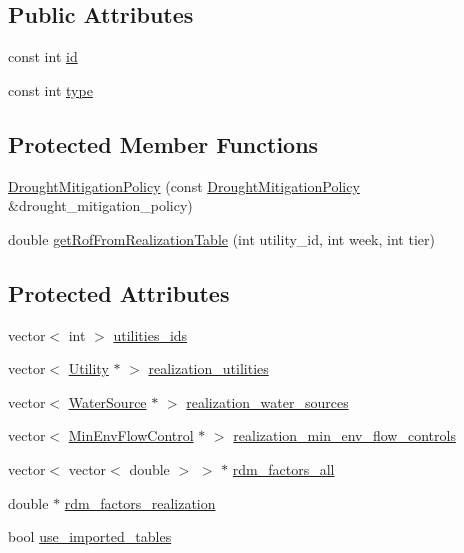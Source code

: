 \subsection*{Public Attributes}
\begin{DoxyCompactItemize}
\item 
const int \mbox{\hyperlink{classDroughtMitigationPolicy_abf3ed19ed98e0d74dc9ae24094be640b}{id}}
\item 
const int \mbox{\hyperlink{classDroughtMitigationPolicy_aaea5016d1462bec889cb8df85aececc6}{type}}
\end{DoxyCompactItemize}
\subsection*{Protected Member Functions}
\begin{DoxyCompactItemize}
\item 
\mbox{\hyperlink{classDroughtMitigationPolicy_aaf0715876ce33a75c7db92e50523ea0c}{Drought\+Mitigation\+Policy}} (const \mbox{\hyperlink{classDroughtMitigationPolicy}{Drought\+Mitigation\+Policy}} \&drought\+\_\+mitigation\+\_\+policy)
\item 
double \mbox{\hyperlink{classDroughtMitigationPolicy_a685ce7eacb01cb262d7e5245a736aa38}{get\+Rof\+From\+Realization\+Table}} (int utility\+\_\+id, int week, int tier)
\end{DoxyCompactItemize}
\subsection*{Protected Attributes}
\begin{DoxyCompactItemize}
\item 
vector$<$ int $>$ \mbox{\hyperlink{classDroughtMitigationPolicy_ad19fbc5a9fdf17ed50c0ba0b99d47eca}{utilities\+\_\+ids}}
\item 
vector$<$ \mbox{\hyperlink{classUtility}{Utility}} $\ast$ $>$ \mbox{\hyperlink{classDroughtMitigationPolicy_af6e5787a58017804d8598effbeeaba8e}{realization\+\_\+utilities}}
\item 
vector$<$ \mbox{\hyperlink{classWaterSource}{Water\+Source}} $\ast$ $>$ \mbox{\hyperlink{classDroughtMitigationPolicy_ae2104e99c421513902ba66d012484c0e}{realization\+\_\+water\+\_\+sources}}
\item 
vector$<$ \mbox{\hyperlink{classMinEnvFlowControl}{Min\+Env\+Flow\+Control}} $\ast$ $>$ \mbox{\hyperlink{classDroughtMitigationPolicy_af583979405bc5d530ee576df8a6e9324}{realization\+\_\+min\+\_\+env\+\_\+flow\+\_\+controls}}
\item 
vector$<$ vector$<$ double $>$ $>$ $\ast$ \mbox{\hyperlink{classDroughtMitigationPolicy_a4c5a2dc2aa3a1c7550cdb17045e1fef3}{rdm\+\_\+factors\+\_\+all}}
\item 
double $\ast$ \mbox{\hyperlink{classDroughtMitigationPolicy_abef5c917bbc076514fe61bfebbd0e4fc}{rdm\+\_\+factors\+\_\+realization}}
\item 
bool \mbox{\hyperlink{classDroughtMitigationPolicy_ace2a2425f6608c34a3189c11445978a1}{use\+\_\+imported\+\_\+tables}}
\end{DoxyCompactItemize}


